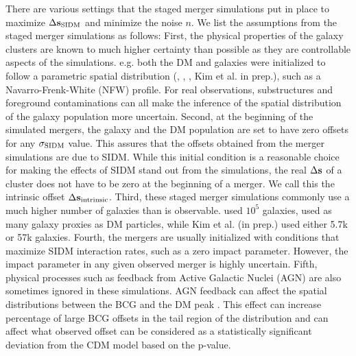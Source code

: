 There are various settings that the staged merger simulations put in place to maximize
$\Delta {\bf s}_{{\rm SIDM}}$ and minimize the noise $n$. 
We list the assumptions from the staged merger simulations as follows: 
First, the physical properties of the galaxy
clusters are known to much higher certainty than possible as they are
controllable aspects of the simulations. e.g. both the DM and 
galaxies were initialized to follow a parametric spatial 
distribution   
(\citealt{Randall2008d}, \citealt{Kahlhoefer14}, \citealt{Robertson2016}, Kim
et al. in prep.), 
such as a Navarro-Frenk-White (NFW) profile. For real observations,
substructures and foreground
contaminations can all make the inference of the spatial distribution 
of the galaxy population more uncertain. 
Second, at the beginning of the simulated mergers, the galaxy and the DM
population are set to have zero offsets for any $\sigma_{\rm SIDM}$ value. 
This assures that the offsets obtained from the merger simulations are due to SIDM. 
While this initial condition 
is a reasonable choice for making the effects of SIDM stand out from the simulations, 
the real $\Delta {\bf s}$ of a cluster does not have to be zero at the 
beginning of a merger. We call this the intrinsic offset $\Delta {\bf s}_{\rm
intrinsic}$.
Third, these staged merger simulations commonly use a much higher number of 
galaxies than is observable. \cite{Randall2008d} used
$10^5$ galaxies, \cite{Kahlhoefer14} used as many galaxy proxies as DM particles, 
while Kim et al. (in prep.) used either 5.7k or 57k galaxies. 
Fourth, the mergers are usually initialized with conditions that maximize SIDM
interaction rates, such as a zero impact parameter. However, the impact
parameter in any given observed merger is highly uncertain. 
Fifth, physical processes such as feedback from Active
Galactic Nuclei (AGN) are also sometimes ignored in these simulations. 
AGN feedback can affect the spatial distributions between the BCG and  
the DM peak \citep{Cui2015}. This effect can increase percentage of large 
BCG offsets in the tail region of the distribution and can affect what observed offset can be 
considered as a statistically significant deviation from the CDM model based on the p-value. 


